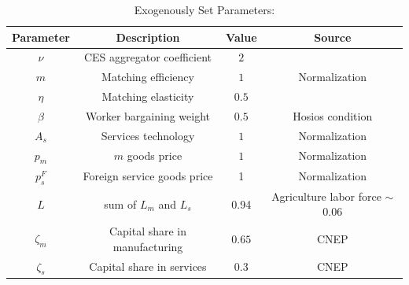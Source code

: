 \documentclass[12pt]{article} %
\theoremstyle{definition}
\begin{document}
\begin{table}[h!]
\centering
\caption{Exogenously Set Parameters:}\label{table_set_parameters}
\begin{tabular}{||c c c c||}\hline
\textbf{Parameter} & \textbf{Description} & \textbf{Value} & \textbf{Source} \\\hline\hline
$\nu$ & CES aggregator coefficient & $2$ & \cite{GTAP} \\
$m$ & Matching efficiency & $1$ & Normalization \\
$\eta$ & Matching elasticity & $0.5$ & \cite{petrongolo2001looking} \\
$\beta$ & Worker bargaining weight & $0.5$ & Hosios condition \\ %
$A_s$ & Services technology & $1$ & Normalization \\
$p_m$ & $m$ goods price & $1$  & Normalization  \\
$p_s^F$ & Foreign service goods price & 1 & Normalization \\
$L$  & sum of $L_m$ and $L_s$  & 0.94  &  Agriculture labor force $\sim$ 0.06\\
$\zeta_m$ & Capital share in manufacturing & $0.65$ & CNEP \\
$\zeta_s$ & Capital share in services & $0.3$ &  CNEP
\\\hline
\end{tabular}
\end{table}
\end{document}
